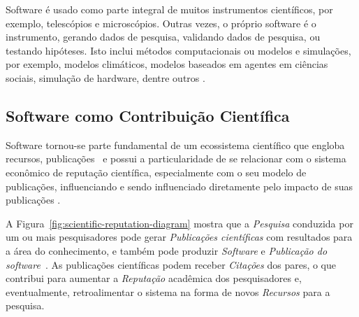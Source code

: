
Software é usado como parte integral de muitos instrumentos científicos, por exemplo, telescópios e microscópios. 
Outras vezes, o próprio software é o instrumento, gerando dados de pesquisa, validando dados de pesquisa, ou testando hipóteses. 
Isto inclui métodos computacionais ou modelos e simulações, por exemplo, modelos climáticos, modelos baseados em agentes em ciências sociais, simulação de hardware, dentre outros \cite{nieuwpoort_defining_2023}.

\subsection{Software como Contribuição Científica}

Software tornou-se parte fundamental de um ecossistema científico que engloba recursos, publicações~\cite{howison2011scientific} e 
possui a particularidade de se relacionar com o sistema econômico de reputação científica, especialmente com o seu modelo de publicações, influenciando e sendo influenciado diretamente pelo impacto de suas publicações \cite{howison2015understanding}.

A Figura~\ref{fig:scientific-reputation-diagram} mostra que a \textit{Pesquisa} conduzida por um ou mais pesquisadores pode gerar \textit{Publicações científicas} com resultados para a área do conhecimento, e também pode produzir \textit{Software} e \textit{Publicação do software}~\cite{howison2015understanding}.
As publicações científicas podem receber \textit{Citações} dos pares, o que contribui para aumentar a \textit{Reputação} acadêmica dos pesquisadores e, eventualmente, retroalimentar o sistema na forma de novos \textit{Recursos} para a pesquisa.


